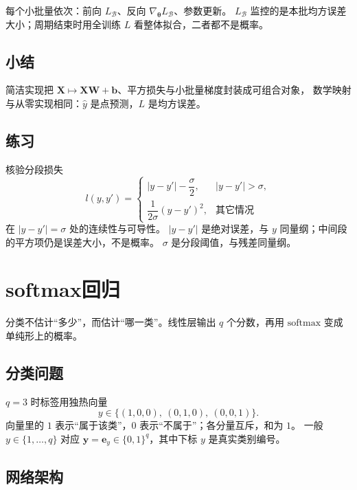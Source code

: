 每个小批量依次：前向 $L_{\mathcal{B}}$、反向 $\nabla_{\bm{\theta}}L_{\mathcal{B}}$、参数更新。
$L_{\mathcal{B}}$ 监控的是本批均方误差大小；周期结束时用全训练 $L$ 看整体拟合，二者都不是概率。

\subsection{小结}

简洁实现把 $\bm{X}\mapsto\bm{X}\bm{W}+\bm{b}$、平方损失与小批量梯度封装成可组合对象，
数学映射与从零实现相同：$\hat{y}$ 是点预测，$L$ 是均方误差。

\subsection{练习}

核验分段损失
\[
l(y,y')=
\begin{cases}
|y-y'|-\dfrac{\sigma}{2}, & |y-y'|>\sigma,\\[0.4em]
\dfrac{1}{2\sigma}(y-y')^{2}, & \text{其它情况}
\end{cases}
\]
在 $|y-y'|=\sigma$ 处的连续性与可导性。
$|y-y'|$ 是绝对误差，与 $y$ 同量纲；中间段的平方项仍是误差大小，不是概率。
$\sigma$ 是分段阈值，与残差同量纲。

\section{softmax回归}



分类不估计“多少”，而估计“哪一类”。线性层输出 $q$ 个分数，再用 $\mathrm{softmax}$ 变成单纯形上的概率。

\subsection{分类问题}

$q=3$ 时标签用独热向量
\[
y\in\{(1,0,0),\ (0,1,0),\ (0,0,1)\}.
\]
向量里的 $1$ 表示“属于该类”，$0$ 表示“不属于”；各分量互斥，和为 $1$。
一般 $y\in\{1,\ldots,q\}$ 对应 $\bm{y}=\bm{e}_{y}\in\{0,1\}^{q}$，其中下标 $y$ 是真实类别编号。

\subsection{网络架构}

